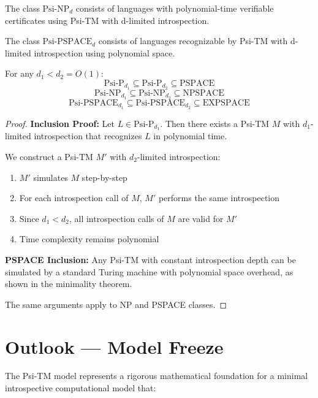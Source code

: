   \begin{definition}
  The class $\text{Psi-NP}_d$ consists of languages with polynomial-time verifiable certificates using Psi-TM with d-limited introspection.
  \end{definition}
  
  \begin{definition}
  The class $\text{Psi-PSPACE}_d$ consists of languages recognizable by Psi-TM with d-limited introspection using polynomial space.
  \end{definition}
  
  \begin{theorem}
  For any $d_1 < d_2 = O(1)$:
  $$\text{Psi-P}_{d_1} \subseteq \text{Psi-P}_{d_2} \subseteq \text{PSPACE}$$
  $$\text{Psi-NP}_{d_1} \subseteq \text{Psi-NP}_{d_2} \subseteq \text{NPSPACE}$$
  $$\text{Psi-PSPACE}_{d_1} \subseteq \text{Psi-PSPACE}_{d_2} \subseteq \text{EXPSPACE}$$
  \end{theorem}
  
  \begin{proof}
  \textbf{Inclusion Proof:}
  Let $L \in \text{Psi-P}_{d_1}$. Then there exists a Psi-TM $M$ with $d_1$-limited introspection that recognizes $L$ in polynomial time.
  
  We construct a Psi-TM $M'$ with $d_2$-limited introspection:
  \begin{enumerate}
  \item $M'$ simulates $M$ step-by-step
  \item For each introspection call of $M$, $M'$ performs the same introspection
  \item Since $d_1 < d_2$, all introspection calls of $M$ are valid for $M'$
  \item Time complexity remains polynomial
  \end{enumerate}
  
  \textbf{PSPACE Inclusion:}
  Any Psi-TM with constant introspection depth can be simulated by a standard Turing machine with polynomial space overhead, as shown in the minimality theorem.
  
  The same arguments apply to NP and PSPACE classes.
  \end{proof}
  
\section{Outlook — Model Freeze}
  
  The Psi-TM model represents a rigorous mathematical foundation for a minimal introspective computational model that:
  
